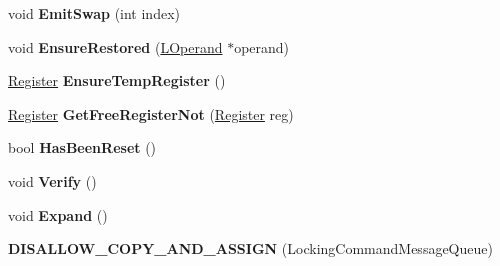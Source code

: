 \begin{DoxyCompactItemize}
\item 
void {\bfseries Emit\+Swap} (int index)\hypertarget{classv8_1_1internal_1_1_b_a_s_e___e_m_b_e_d_d_e_d_ad8b20a6e68d3330b407c5a5c71838ca4}{}\label{classv8_1_1internal_1_1_b_a_s_e___e_m_b_e_d_d_e_d_ad8b20a6e68d3330b407c5a5c71838ca4}

\item 
void {\bfseries Ensure\+Restored} (\hyperlink{classv8_1_1internal_1_1_l_operand}{L\+Operand} $\ast$operand)\hypertarget{classv8_1_1internal_1_1_b_a_s_e___e_m_b_e_d_d_e_d_aab9bc7efff6404b47ba72ff9374eea44}{}\label{classv8_1_1internal_1_1_b_a_s_e___e_m_b_e_d_d_e_d_aab9bc7efff6404b47ba72ff9374eea44}

\item 
\hyperlink{structv8_1_1internal_1_1_register}{Register} {\bfseries Ensure\+Temp\+Register} ()\hypertarget{classv8_1_1internal_1_1_b_a_s_e___e_m_b_e_d_d_e_d_a7b556e67b4069495b0ce5748e3691356}{}\label{classv8_1_1internal_1_1_b_a_s_e___e_m_b_e_d_d_e_d_a7b556e67b4069495b0ce5748e3691356}

\item 
\hyperlink{structv8_1_1internal_1_1_register}{Register} {\bfseries Get\+Free\+Register\+Not} (\hyperlink{structv8_1_1internal_1_1_register}{Register} reg)\hypertarget{classv8_1_1internal_1_1_b_a_s_e___e_m_b_e_d_d_e_d_a4264abd1a39f22e9bf808863bce3f794}{}\label{classv8_1_1internal_1_1_b_a_s_e___e_m_b_e_d_d_e_d_a4264abd1a39f22e9bf808863bce3f794}

\item 
bool {\bfseries Has\+Been\+Reset} ()\hypertarget{classv8_1_1internal_1_1_b_a_s_e___e_m_b_e_d_d_e_d_a0278b055ebb2957ecc78aafd24dc2c3a}{}\label{classv8_1_1internal_1_1_b_a_s_e___e_m_b_e_d_d_e_d_a0278b055ebb2957ecc78aafd24dc2c3a}

\item 
void {\bfseries Verify} ()\hypertarget{classv8_1_1internal_1_1_b_a_s_e___e_m_b_e_d_d_e_d_a46f1b6e1093c631ee3b7dfca3abc94e9}{}\label{classv8_1_1internal_1_1_b_a_s_e___e_m_b_e_d_d_e_d_a46f1b6e1093c631ee3b7dfca3abc94e9}

\item 
void {\bfseries Expand} ()\hypertarget{classv8_1_1internal_1_1_b_a_s_e___e_m_b_e_d_d_e_d_a6f0666b7b94806584847aa096c0cfee3}{}\label{classv8_1_1internal_1_1_b_a_s_e___e_m_b_e_d_d_e_d_a6f0666b7b94806584847aa096c0cfee3}

\item 
{\bfseries D\+I\+S\+A\+L\+L\+O\+W\+\_\+\+C\+O\+P\+Y\+\_\+\+A\+N\+D\+\_\+\+A\+S\+S\+I\+GN} (Locking\+Command\+Message\+Queue)\hypertarget{classv8_1_1internal_1_1_b_a_s_e___e_m_b_e_d_d_e_d_af59145c2c26584bc82e7944ac922f80b}{}\label{classv8_1_1internal_1_1_b_a_s_e___e_m_b_e_d_d_e_d_af59145c2c26584bc82e7944ac922f80b}


\end{DoxyCompactItemize}
